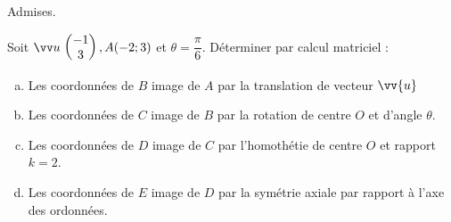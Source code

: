\documentclass[10pt,a4paper]{article}
\begin{document}
\dem Admises.


\medskip

\exe Soit $\Coord{u}{-1}{3},A(-2;3)$ et $ \theta = \dfrac{\pi}{6}$. Déterminer par calcul matriciel :

\begin{enumerate}[a.]
\item Les coordonnées de $B$ image de $A$ par la translation de vecteur $\vv{u}$
\item Les coordonnées de $C$ image de $B$ par la rotation de centre $O$ et d'angle $\theta$. 
\item Les coordonnées de $D$ image de $C$ par l'homothétie de centre $O$ et rapport $k=2$.
\item Les coordonnées de $E$ image de $D$ par la symétrie axiale par rapport à l'axe des ordonnées.
\end{enumerate}
\end{document}
